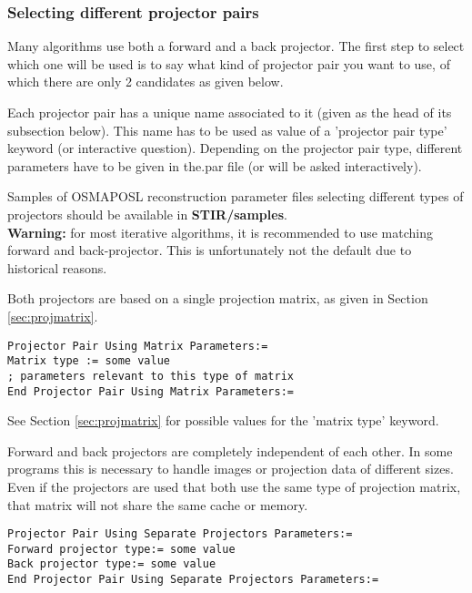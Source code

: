\documentclass{article}
\begin{document}
\subsubsection{
Selecting different projector pairs}
\label{sec:projectorpairs}
Many algorithms use both a forward and a back projector. The 
first step to select which one will be used is to say what kind 
of projector pair you want to use, of which there are only 2 
candidates as given below. 


Each projector pair has a unique name associated to it (given 
as the head of its subsection below). This name has to be used 
as value of a 'projector pair type' keyword (or interactive question). 
Depending on the projector pair type, different parameters have 
to be given in the.par file (or will be asked interactively).


Samples of OSMAPOSL reconstruction parameter files selecting 
different types of projectors should be available in \textbf{STIR/samples}.\\
\textbf{Warning:} for most iterative algorithms, it is recommended 
to use matching forward and back-projector. This is unfortunately 
not the default due to historical reasons.

{ 
}
\label{sec:projectorpairusingmatrix}
Both projectors are based on a single projection matrix, as given 
in Section \ref{sec:projmatrix}.

{ 
}
\begin{verbatim}
Projector Pair Using Matrix Parameters:=
Matrix type := some value
; parameters relevant to this type of matrix
End Projector Pair Using Matrix Parameters:=
\end{verbatim}

See Section \ref{sec:projmatrix} for possible values for the 'matrix type' keyword.

{ 
}

Forward and back projectors are completely independent of each 
other. In some programs this is necessary to handle images or 
projection data of different sizes. \\
Even if the projectors are used that both use the same type of 
projection matrix, that matrix will not share the same cache 
or memory.

{ 
}
\begin{verbatim}
Projector Pair Using Separate Projectors Parameters:=
Forward projector type:= some value
Back projector type:= some value
End Projector Pair Using Separate Projectors Parameters:=
\end{verbatim}
\end{document}
